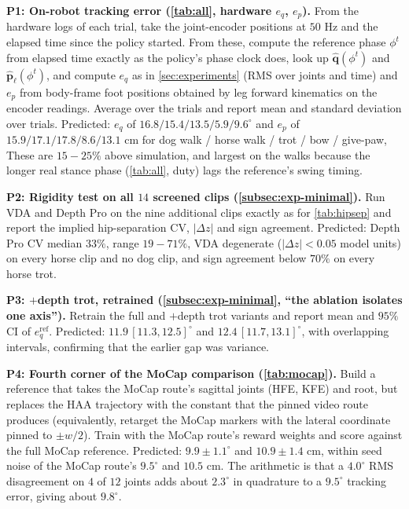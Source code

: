 \textbf{P1: On-robot tracking error (\autoref{tab:all}, hardware $e_q$, $e_p$).} From the hardware logs of each trial, take the joint-encoder positions at $50$ Hz and the elapsed time since the policy started. From these, compute the reference phase $\phi^t$ from elapsed time exactly as the policy's phase clock does, look up $\hat{\mathbf{q}}(\phi^t)$ and $\hat{\mathbf{p}}_\ell(\phi^t)$, and compute $e_q$ as in \autoref{sec:experiments} (RMS over joints and time) and $e_p$ from body-frame foot positions obtained by leg forward kinematics on the encoder readings. Average over the trials and report mean and standard deviation over trials. Predicted: $e_q$ of $16.8/15.4/13.5/5.9/9.6^\circ$ and $e_p$ of $15.9/17.1/17.8/8.6/13.1$ cm for dog walk / horse walk / trot / bow / give-paw, These are $15-25\%$ above simulation, and largest on the walks because the longer real stance phase (\autoref{tab:all}, duty) lags the reference's swing timing.

\textbf{P2: Rigidity test on all $14$ screened clips (\autoref{subsec:exp-minimal}).} Run VDA and Depth Pro on the nine additional clips exactly as for \autoref{tab:hipsep} and report the implied hip-separation CV, $|\Delta z|$ and sign agreement. Predicted: Depth Pro CV median $33\%$, range $19-71\%$, VDA degenerate ($|\Delta z|<0.05$ model units) on every horse clip and no dog clip, and sign agreement below $70\%$ on every horse trot.

\textbf{P3: $+$depth trot, retrained (\autoref{subsec:exp-minimal}, ``the ablation isolates one axis'').} Retrain the full and $+$depth trot variants and report mean and $95\%$ CI of $e_q^{\mathrm{ref}}$. Predicted: $11.9\,[11.3,12.5]^\circ$ and $12.4\,[11.7,13.1]^\circ$, with overlapping intervals, confirming that the earlier gap was variance.

\textbf{P4: Fourth corner of the MoCap comparison (\autoref{tab:mocap}).} Build a reference that takes the MoCap route's sagittal joints (HFE, KFE) and root, but replaces the HAA trajectory with the constant that the pinned video route produces (equivalently, retarget the MoCap markers with the lateral coordinate pinned to $\pm w/2$). Train with the MoCap route's reward weights and score against the full MoCap reference. Predicted: $9.9\pm1.1^\circ$ and $10.9\pm1.4$ cm, within seed noise of the MoCap route's $9.5^\circ$ and $10.5$ cm. The arithmetic is that a $4.0^\circ$ RMS disagreement on $4$ of $12$ joints adds about $2.3^\circ$ in quadrature to a $9.5^\circ$ tracking error, giving about $9.8^\circ$.


